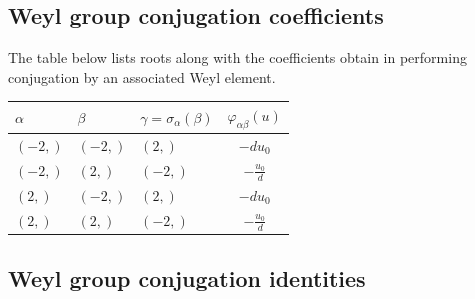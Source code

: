 \documentclass[11pt]{article}
\newcommand{\noi}{\noindent}
\theoremstyle{definition}
\begin{document}
\subsection{Weyl group conjugation coefficients}

The table below lists roots along with the coefficients obtain in performing conjugation by an associated Weyl element.

\bigskip

\noi \noindent \begin{longtable}{|l|l|l|c|}
    \hline
    \textbf{$\alpha$} & \textbf{$\beta$} & \textbf{$\gamma = \sigma_{\alpha}(\beta)$} & $\varphi_{\alpha\beta}(u)$ \\
    \hline
    \endhead
    $\left( -2,\right)$ & $\left( -2,\right)$ & $\left( 2,\right)$ & $- d u_{0}$ \\
    \hline
    $\left( -2,\right)$ & $\left( 2,\right)$ & $\left( -2,\right)$ & $- \frac{u_{0}}{d}$ \\
    \hline
    $\left( 2,\right)$ & $\left( -2,\right)$ & $\left( 2,\right)$ & $- d u_{0}$ \\
    \hline
    $\left( 2,\right)$ & $\left( 2,\right)$ & $\left( -2,\right)$ & $- \frac{u_{0}}{d}$ \\
    \hline
\end{longtable}


\subsection{Weyl group conjugation identities}
\end{document}
